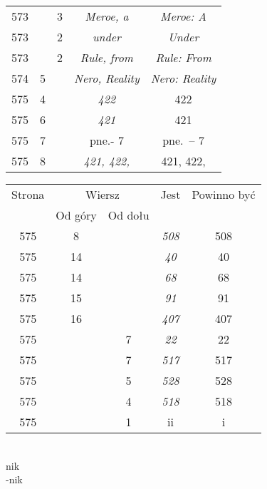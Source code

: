 \documentclass[a4paper,11pt]{article}
\numberwithin{equation}{section}
\begin{document}
\begin{center}
\begin{tabular}{|c|c|c|c|c|}
    573 & & \hphantom{0}3 & \textit{Meroe, a} & \textit{Meroe: A} \\
    573 & & \hphantom{0}2 & \textit{under} & \textit{Under} \\
    573 & & \hphantom{0}2 & \textit{Rule, from} & \textit{Rule: From} \\
    574 & \hphantom{0}5 & & \textit{Nero, Reality}
    & \textit{Nero: Reality} \\
    575 & \hphantom{0}4 & & \textit{422} & 422 \\
    575 & \hphantom{0}6 & & \textit{421} & 421 \\
    575 & \hphantom{0}7 & & pne.- 7 & pne.~-- 7 \\
    575 & \hphantom{0}8 & & \textit{421, 422,} & 421, 422, \\
    \hline
  \end{tabular}





  \newpage

  \begin{tabular}{|c|c|c|c|c|}
    \hline
    Strona & \multicolumn{2}{c|}{Wiersz} & Jest
    & Powinno być \\ \cline{2-3}
    & Od góry & Od dołu & & \\
    \hline
    575 & \hphantom{0}8 & & \textit{508} & 508 \\
    575 & 14 & & \textit{40} & 40 \\
    575 & 14 & & \textit{68} & 68 \\
    575 & 15 & & \textit{91} & 91 \\
    575 & 16 & & \textit{407} & 407 \\
    575 & & \hphantom{0}7 & \textit{22} & 22 \\
    575 & & \hphantom{0}7 & \textit{517} & 517 \\
    575 & & \hphantom{0}5 & \textit{528} & 528 \\
    575 & & \hphantom{0}4 & \textit{518} & 518 \\
    575 & & \hphantom{0}1 & ii & i \\
    \hline
  \end{tabular}

\end{center}

\VerSpaceSix


\noindent
{} \\
\Jest \hspace{5pt} nik \\
\PowinnoByc -nik \\
\end{document}
